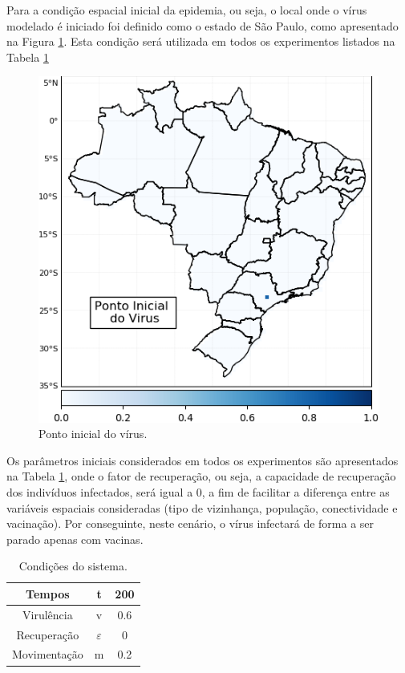 \documentclass[a4paper,12pt]{article}
\begin{document}
\newpage

Para a condição espacial inicial da epidemia, ou seja, o local onde o vírus modelado é iniciado foi definido como o estado de São Paulo, como apresentado na Figura \ref{figure:CI_virus}. Esta condição será utilizada em todos os experimentos listados na Tabela \ref{figure:CI_virus} \\

\begin{figure}[!ht]
 \begin{center}
  \includegraphics[width=0.45\linewidth]{fig/ponto_inicial_virus.png}
 \end{center}
 \caption{Ponto inicial do vírus.}
\label{figure:CI_virus}
\end{figure}

Os parâmetros iniciais considerados em todos os experimentos são apresentados na Tabela \ref{tab:condicoes2}, onde o fator de recuperação, ou seja, a capacidade de recuperação dos indivíduos infectados, será igual a 0, a fim de facilitar a diferença entre as variáveis espaciais consideradas (tipo de vizinhança, população, conectividade e vacinação). Por conseguinte, neste cenário, o vírus infectará de forma a ser parado apenas com vacinas.

\begin{table}[ht]
 \caption{Condições do sistema.}
 \centering
 \begin{tabular}{c|c|c}
 Tempos & t & 200 \\
 \hline
 Virulência & v & 0.6 \\
 Recuperação & $\varepsilon$ & 0 \\
 Movimentação & m & 0.2
 \end{tabular}
 \label{tab:condicoes2}
\end{table}
\end{document}

